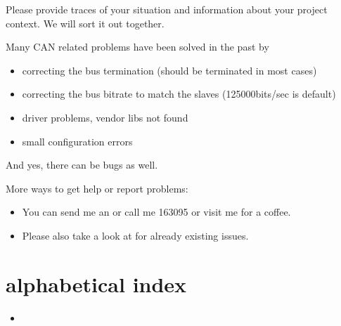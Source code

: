 \documentclass[a4paper,10pt,english]{sphinxmanual}
\begin{document}
\sphinxAtStartPar
Please provide traces of your situation and information about your project context. We will sort it out together.

\sphinxAtStartPar
Many CAN related problems have been solved in the past by
\begin{itemize}
\item {} 
\sphinxAtStartPar
correcting the bus termination (should be terminated in most cases)

\item {} 
\sphinxAtStartPar
correcting the bus bitrate to match the slaves (125000bits/sec is default)

\item {} 
\sphinxAtStartPar
driver problems, vendor libs not found

\item {} 
\sphinxAtStartPar
small configuration errors

\end{itemize}

\sphinxAtStartPar
And yes, there can be bugs as well.

\sphinxAtStartPar
More  ways to get help or report problems:
\begin{itemize}
\item {} 
\sphinxAtStartPar
You can send me an  or call me 163095 or visit me for a coffee.

\item {} 
\sphinxAtStartPar
Please also take a look at  for already existing issues.

\end{itemize}


\chapter{alphabetical index}
\label{\detokenize{index:alphabetical-index}}\begin{itemize}
\item {} 
\sphinxAtStartPar
{}

\end{itemize}



\renewcommand{\indexname}{Index}
\printindex
\end{document}
